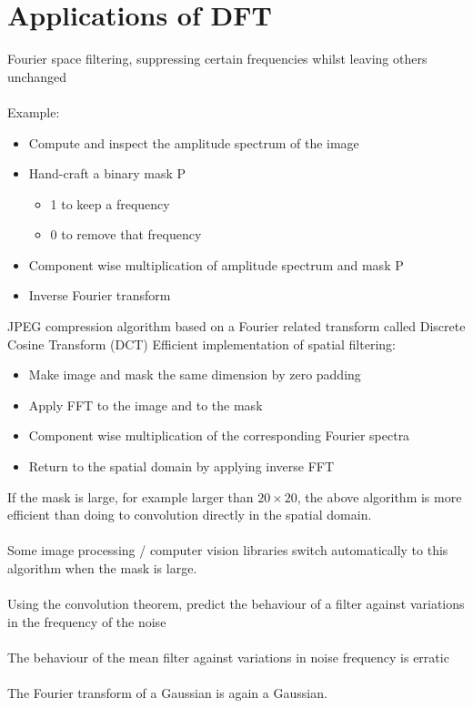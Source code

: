 \documentclass{article}[18pt]
\begin{document}
\section{Applications of DFT}
Fourier space filtering, suppressing certain frequencies whilst leaving others unchanged\\
\\
Example:
\begin{itemize}
	\item Compute and inspect the amplitude spectrum of the image
	\item Hand-craft a binary mask P
	\begin{itemize}
		\item 1 to keep a frequency
		\item 0 to remove that frequency
	\end{itemize}
	\item Component wise multiplication of amplitude spectrum and mask P
	\item Inverse Fourier transform
\end{itemize}
JPEG compression algorithm based on a Fourier related transform called Discrete Cosine Transform (DCT)
Efficient implementation of spatial filtering:
\begin{itemize}
	\item Make image and mask the same dimension by zero padding
	\item Apply FFT to the image and to the mask
	\item Component wise multiplication of the corresponding Fourier spectra
	\item Return to the spatial domain by applying inverse FFT
\end{itemize}
If the mask is large, for example larger than $20\times 20$, the above algorithm is more efficient than doing to convolution directly in the spatial domain.\\
\\
Some image processing / computer vision libraries switch automatically to this algorithm when the mask is large.\\
\\
Using the convolution theorem, predict the behaviour of a filter against variations in the frequency of the noise\\
\\
The behaviour of the mean filter against variations in noise frequency is erratic\\
\\
The Fourier transform of a Gaussian is again a Gaussian.
\end{document}
